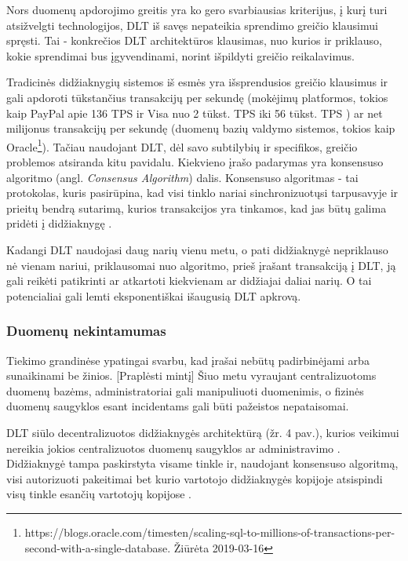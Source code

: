 Nors duomenų apdorojimo greitis yra ko gero svarbiausias kriterijus, į kurį turi atsižvelgti technologijos, DLT iš savęs nepateikia sprendimo greičio klausimui spręsti. Tai - konkrečios DLT architektūros klausimas, nuo kurios ir priklauso, kokie sprendimai bus įgyvendinami, norint išpildyti greičio reikalavimus.

Tradicinės didžiaknygių sistemos iš esmės yra išsprendusios greičio klausimus ir gali apdoroti tūkstančius transakcijų per sekundę (mokėjimų platformos, tokios kaip PayPal apie 136 TPS ir Visa nuo 2 tūkst. TPS iki 56 tūkst. TPS \cite{herrera2016privacy}) ar net milijonus transakcijų per sekundę (duomenų bazių valdymo sistemos, tokios kaip Oracle\footnote{https://blogs.oracle.com/timesten/scaling-sql-to-millions-of-transactions-per-second-with-a-single-database. Žiūrėta 2019-03-16}). Tačiau naudojant DLT, dėl savo subtilybių ir specifikos, greičio problemos atsiranda kitu pavidalu. Kiekvieno įrašo padarymas yra konsensuso algoritmo (angl. \textit{Consensus Algorithm}) dalis. Konsensuso algoritmas - tai protokolas, kuris pasirūpina, kad visi tinklo nariai sinchronizuotųsi tarpusavyje ir prieitų bendrą sutarimą, kurios transakcijos yra tinkamos, kad jas būtų galima pridėti į didžiaknygę \cite{cachin2017blockchain}. 

Kadangi DLT naudojasi daug narių vienu metu, o pati didžiaknygė nepriklauso nė vienam nariui, priklausomai nuo algoritmo, prieš įrašant transakciją į DLT, ją gali reikėti patikrinti ar atkartoti kiekvienam ar didžiajai daliai narių. O tai potencialiai gali lemti eksponentiškai išaugusią DLT apkrovą. 




\subsubsection{Duomenų nekintamumas}

Tiekimo grandinėse ypatingai svarbu, kad įrašai nebūtų padirbinėjami arba sunaikinami be žinios. [Praplėsti mintį] Šiuo metu vyraujant centralizuotoms duomenų bazėms, administratoriai gali manipuliuoti duomenimis, o fizinės duomenų saugyklos esant incidentams gali būti pažeistos nepataisomai.

DLT siūlo decentralizuotos didžiaknygės architektūrą (žr. 4 pav.), kurios veikimui nereikia jokios centralizuotos duomenų saugyklos ar administravimo \cite{yu2018virtualization}. Didžiaknygė tampa paskirstyta visame tinkle ir, naudojant konsensuso algoritmą, visi autorizuoti pakeitimai bet kurio vartotojo didžiaknygės kopijoje atsispindi visų tinkle esančių vartotojų kopijose \cite{puthal2018blockchain}. 

